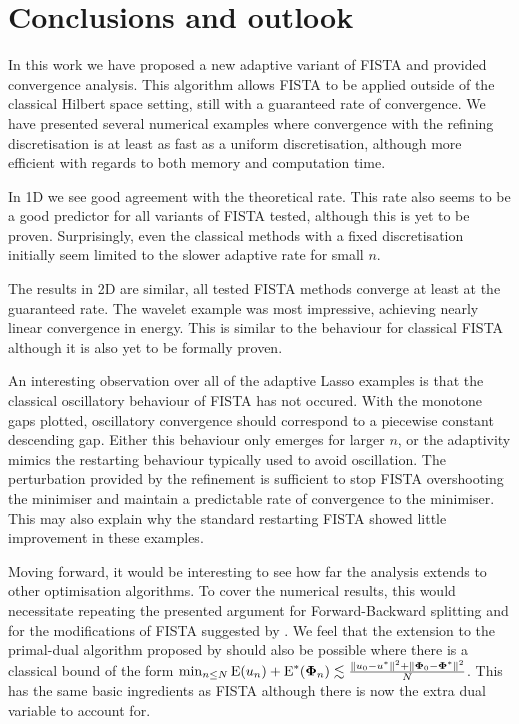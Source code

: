 \documentclass[10pt,a4paper,onecolumn]{article} \usepackage[latin1]{inputenc}
\numberwithin{equation}{section}
\newcommand{\norm}[1]{{\left\lVert #1 \right\rVert}}
\newcommand{\op}[1]{\operatorname{#1}}\newcommand{\overtext}[2]{\stackrel{\text{#1}}{#2}}
\renewcommand{\vec}{\mathbf}
\newcommand*{\Func}[1]{%
	\IfEqCase{#1}{%
		{0}{\op{E}}%
		{1}{\op{F}}%
		{2}{\op{G}}%
		{3}{\op{H}}%
	}[\op{F}#1]%
}
\newcommand*{\varf}[1]{%
	\IfEqCase{#1}{%
		{0}{u}%
		{1}{v}%
		{2}{w}%
	}[u#1]%
}
\newcommand*{\vard}[1]{%
	\IfEqCase{#1}{%
		{0}{\varphi}%
		{1}{\psi}%
	}[\varphi #1]%
}
\newcommand*{\data}[1]{%
	\IfEqCase{#1}{%
		{0}{\eta}%
		{1}{\nu}%
	}[g]%
}
\newcommand*{\vvard}[1]{\vec{\vard{#1}}}\newcommand*{\vdata}[1]{\vec{\data{#1}}}
\begin{document}
\section{Conclusions and outlook}
In this work we have proposed a new adaptive variant of FISTA and provided convergence analysis. This algorithm allows FISTA to be applied outside of the classical Hilbert space setting, still with a guaranteed rate of convergence. We have presented several numerical examples where convergence with the refining discretisation is at least as fast as a uniform discretisation, although more efficient with regards to both memory and computation time. 

In 1D we see good agreement with the theoretical rate. This rate also seems to be a good predictor for all variants of FISTA tested, although this is yet to be proven. Surprisingly, even the classical methods with a fixed discretisation initially seem limited to the slower adaptive rate for small $n$.

The results in 2D are similar, all tested FISTA methods converge at least at the guaranteed rate. The wavelet example was most impressive, achieving nearly linear convergence in energy. This is similar to the behaviour for classical FISTA although it is also yet to be formally proven.

An interesting observation over all of the adaptive Lasso examples is that the classical oscillatory behaviour of FISTA has not occured. With the monotone gaps plotted, oscillatory convergence should correspond to a piecewise constant descending gap. Either this behaviour only emerges for larger $n$, or the adaptivity mimics the restarting behaviour typically used to avoid oscillation. The perturbation provided by the refinement is sufficient to stop FISTA overshooting the minimiser and maintain a predictable rate of convergence to the minimiser. This may also explain why the standard restarting FISTA showed little improvement in these examples.

Moving forward, it would be interesting to see how far the analysis extends to other optimisation algorithms. To cover the numerical results, this would necessitate repeating the presented argument for Forward-Backward splitting and for the modifications of FISTA suggested by \cite{Liang2018}. We feel that the extension to the primal-dual algorithm proposed by \cite{Chambolle2011} should also be possible where there is a classical bound of the form $\min_{n\leq N}\Func0(\varf0_n)+\Func0^*(\vvard0_n) \lesssim \frac{\norm{\varf0_0-\varf0^*}^2 + \norm{\vvard0_0-\vvard0^*}^2}{N}$. This has the same basic ingredients as FISTA although there is now the extra dual variable to account for.
\end{document}
